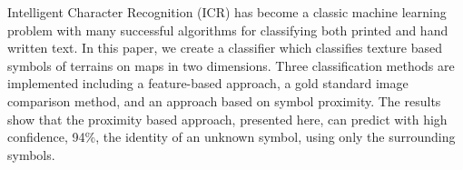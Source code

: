 
Intelligent Character Recognition (ICR) has become a classic machine learning
problem with many successful algorithms for classifying both printed and hand
written text. In this paper, we create a classifier which classifies texture
based symbols of terrains on maps in two dimensions. Three classification
methods are implemented including a feature-based approach, a gold standard
image comparison method, and an approach based on symbol proximity. The results
show that the proximity based approach, presented here, can predict with high
confidence, 94\%, the identity of an unknown symbol, using only the surrounding
symbols.


